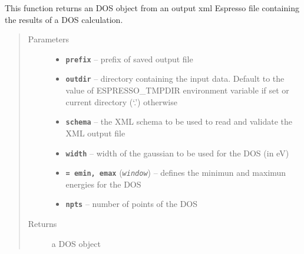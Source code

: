 \documentclass[letterpaper,10pt,english]{sphinxmanual}
\begin{document}
\begin{fulllineitems}
\label{postqe:postqe.api.get_dos}
This function returns an DOS object from an output xml Espresso file containing the
results of a DOS calculation.
\begin{quote}\begin{description}
\item[{Parameters}] \leavevmode\begin{itemize}
\item {} 
\textbf{\texttt{prefix}} -- prefix of saved output file

\item {} 
\textbf{\texttt{outdir}} -- directory containing the input data. Default to the value of
ESPRESSO\_TMPDIR environment variable if set or current directory (`.') otherwise

\item {} 
\textbf{\texttt{schema}} -- the XML schema to be used to read and validate the XML output file

\item {} 
\textbf{\texttt{width}} -- width of the gaussian to be used for the DOS (in eV)

\item {} 
\textbf{\texttt{= emin, emax}} (\emph{\texttt{window}}) -- defines the minimun and maximun energies for the DOS

\item {} 
\textbf{\texttt{npts}} -- number of points of the DOS

\end{itemize}

\item[{Returns}] \leavevmode
a DOS object

\end{description}\end{quote}

\end{fulllineitems}

\end{document}
